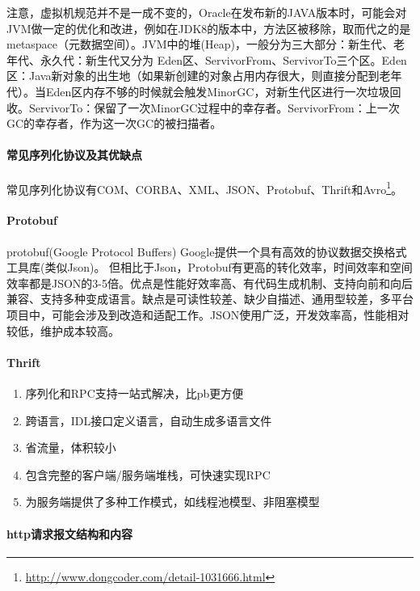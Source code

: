 \documentclass[../../../interview-questions.tex]{subfiles}
\begin{document}
注意，虚拟机规范并不是一成不变的，Oracle在发布新的JAVA版本时，可能会对JVM做一定的优化和改进，例如在JDK8的版本中，方法区被移除，取而代之的是metaspace（元数据空间）。JVM中的堆(Heap)，一般分为三大部分：新生代、老年代、永久代：新生代又分为 Eden区、ServivorFrom、ServivorTo三个区。Eden区：Java新对象的出生地（如果新创建的对象占用内存很大，则直接分配到老年代）。当Eden区内存不够的时候就会触发MinorGC，对新生代区进行一次垃圾回收。ServivorTo：保留了一次MinorGC过程中的幸存者。ServivorFrom：上一次GC的幸存者，作为这一次GC的被扫描者。








\paragraph{常见序列化协议及其优缺点}

常见序列化协议有COM、CORBA、XML、JSON、Protobuf、Thrift和Avro\footnote{\url{http://www.dongcoder.com/detail-1031666.html}}。

\paragraph{Protobuf}protobuf(Google Protocol Buffers)
Google提供一个具有高效的协议数据交换格式工具库(类似Json)。
但相比于Json，Protobuf有更高的转化效率，时间效率和空间效率都是JSON的3-5倍。优点是性能好效率高、有代码生成机制、支持向前和向后兼容、支持多种变成语言。缺点是可读性较差、缺少自描述、通用型较差，多平台项目中，可能会涉及到改造和适配工作。JSON使用广泛，开发效率高，性能相对较低，维护成本较高。

\paragraph{Thrift}

\begin{enumerate}
\item {序列化和RPC支持一站式解决，比pb更方便}
\item{跨语言，IDL接口定义语言，自动生成多语言文件}
\item{省流量，体积较小}
\item{包含完整的客户端/服务端堆栈，可快速实现RPC}
\item{为服务端提供了多种工作模式，如线程池模型、非阻塞模型}
\end{enumerate}


\paragraph{http请求报文结构和内容}
\end{document}
